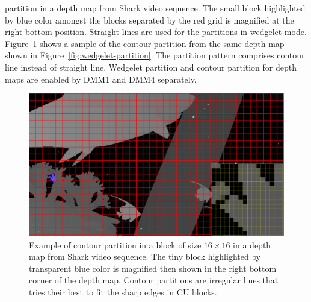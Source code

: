 partition in a depth map from Shark video sequence.
The small block highlighted by blue color amongst the blocks
separated by the red grid is magnified at the right-bottom position.
Straight lines are used for the partitions in wedgelet mode.
Figure~\ref{fig:contour-partition} shows a sample of the contour partition
from the same depth map shown in Figure~\ref{fig:wedgelet-partition}.
The partition pattern comprises contour line instead of
straight line.
Wedgelet partition and contour partition for depth maps
are enabled by DMM1 and DMM4 separately.
\begin{figure}
    \centering
    \includegraphics[width=\textwidth,height=\textheight,keepaspectratio]{Figures/contour}
    \caption[Contour partition illustration]
    {Example of contour partition in a block of size \(16\times16\) in a depth map
    from Shark video sequence.
    The tiny block highlighted by transparent blue color
    is magnified then shown in the right bottom corner
    of the depth map.
    Contour partitions are irregular lines
    that tries their best to fit the sharp edges in CU blocks.
    }\label{fig:contour-partition}
\end{figure}



